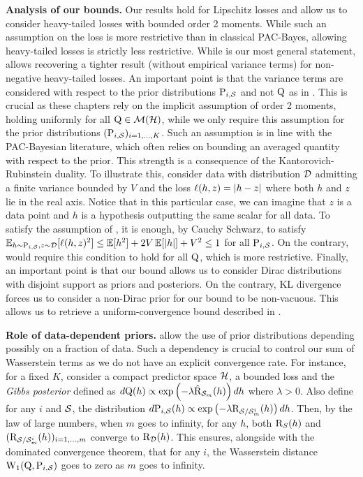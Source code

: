 \textbf{Analysis of our bounds.} Our results hold for Lipschitz losses and allow us to consider heavy-tailed losses with bounded order 2 moments.
While such an assumption on the loss is more restrictive than in classical PAC-Bayes, allowing heavy-tailed losses is strictly less restrictive. 
While  is our most general statement,  allows recovering a tighter result (without empirical variance terms) for non-negative heavy-tailed losses. 
An important point is that the variance terms are considered with respect to the prior distributions $\P_{i,\S}$  and not $\Q$ as in . This is crucial as these chapters rely on the implicit assumption of order 2 moments, holding uniformly for all $\Q\in\Mcal(\H)$, while we only require this assumption for the prior distributions $(\P_{i,\S})_{i=1,\dots,K}$.
Such an assumption is in line with the PAC-Bayesian literature, which often relies on bounding an averaged quantity with respect to the prior.
This strength is a consequence of the Kantorovich-Rubinstein duality.
To illustrate this, consider \iid data with distribution $\D$ admitting a finite variance bounded by $V$ and the loss $\loss(h,z)= |h-z|$ where both $h$ and $z$ lie in the real axis.
Notice that in this particular case, we can imagine that $z$ is a data point and $h$ is a hypothesis outputting the same scalar for all data.
To satisfy the assumption of , it is enough, by Cauchy Schwarz, to satisfy  $\EE_{h\sim \P_{i,\S},z\sim\D}[\loss(h,z)^2] \le \EE[h^2] + 2V\EE[|h|] +V^2 \leq 1$ for all $\P_{i,\S}$.
On the contrary,  would require this condition to hold for all $\Q$, which is more restrictive.
Finally, an important point is that our bound allows us to consider Dirac distributions with disjoint support as priors and posteriors.
On the contrary, KL divergence forces us to consider a non-Dirac prior for our bound to be non-vacuous. 
This allows us to retrieve a uniform-convergence bound described in .

\textbf{Role of data-dependent priors.} 
 allow the use of prior distributions depending possibly on a fraction of data.
Such a dependency is crucial to control our sum of Wasserstein terms as we do not have an explicit convergence rate.
For instance, for a fixed $K$, consider a compact predictor space $\H$, a bounded loss and the \emph{Gibbs posterior} defined as $d\Q(h) \propto \exp\left(-\lambda \Riskhat_{\Sm}(h)\right)dh$ where $\lambda>0$.
Also define for any $i$ and $\S$, the distribution $d\P_{i,\S}(h) \propto \exp\left(-\lambda \Risk_{\S/\Sm^{i}}(h)\right)dh$. Then, by the law of large numbers, when $m$ goes to infinity, for any $h$, both $\Risk_S(h)$ and $(\Risk_{\S/\Sm^{i}}(h))_{i=1,\dots,m}$ converge to $\Risk_\D(h)$. 
This ensures, alongside with the dominated convergence theorem, that for any $i$, the Wasserstein distance $\W_{1}(\Q,\P_{i,\S})$ goes to zero as $m$ goes to infinity.  

